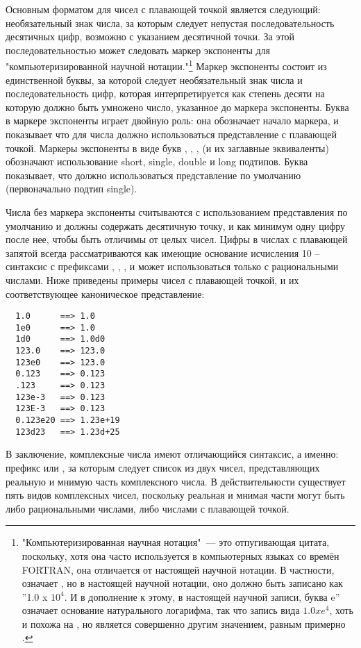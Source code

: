 Основным форматом для чисел с плавающей точкой является следующий: необязательный знак
числа, за которым следует непустая последовательность десятичных цифр, возможно с
указанием десятичной точки.  За этой последовательностью может следовать маркер экспоненты
для "компьютеризированной научной нотации."\footnote{"Компьютеризированная научная
  нотация"~--- это отпугивающая цитата, поскольку, хотя она часто используется в
  компьютерных языках со времён FORTRAN, она отличается от настоящей научной нотации.  В
  частности,  означает , но в настоящей научной нотации, оно
  должно быть записано как ''1.0 x $10^4$.  И в дополнение к этому, в настоящей научной
  записи, буква e'' означает основание натурального логарифма, так что запись вида $1.0 x
  e^4$, хоть и похожа на , но является совершенно другим значением, равным
  примерно .}  Маркер экспоненты состоит из единственной буквы, за которой
следует необязательный знак числа и последовательность цифр, которая интерпретируется как
степень десяти на которую должно быть умножено число, указанное до маркера экспоненты.
Буква в маркере экспоненты играет двойную роль: она обозначает начало маркера, и
показывает что для числа должно использоваться представление с плавающей точкой.  Маркеры
экспоненты в виде букв , , ,  (и их заглавные эквиваленты)
обозначают использование short, single, double и long подтипов.  Буква 
показывает, что должно использоваться представление по умолчанию (первоначально подтип
single).

Числа без маркера экспоненты считываются с использованием представления по умолчанию и
должны содержать десятичную точку, и как минимум одну цифру после нее, чтобы быть отличимы
от целых чисел.  Цифры в числах с плавающей запятой всегда рассматриваются как имеющие
основание исчисления 10 -- синтаксис с префиксами , , , и
 может использоваться только с рациональными числами.  Ниже приведены примеры
чисел с плавающей точкой, и их соответствующее каноническое представление:

\begin{verbatim}
  1.0      ==> 1.0
  1e0      ==> 1.0
  1d0      ==> 1.0d0
  123.0    ==> 123.0
  123e0    ==> 123.0
  0.123    ==> 0.123
  .123     ==> 0.123
  123e-3   ==> 0.123
  123E-3   ==> 0.123
  0.123e20 ==> 1.23e+19
  123d23   ==> 1.23d+25
\end{verbatim}

В заключение, комплексные числа имеют отличающийся синтаксис, а именно: префикс 
или , за которым следует список из двух чисел, представляющих реальную и мнимую
часть комплексного числа.  В действительности существует пять видов комплексных чисел,
поскольку реальная и мнимая части могут быть либо рациональными числами, либо числами с
плавающей точкой.

